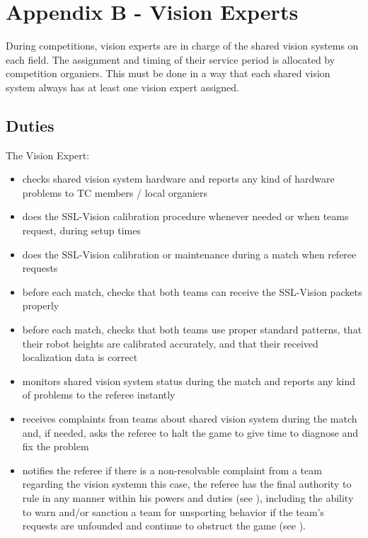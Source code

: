 \section{Appendix B - Vision Experts}\label{app:vision-experts}

During competitions, vision experts are in charge of the shared vision systems on each field.
The assignment and timing of their service period is allocated by competition organiers.
This must be done in a way that each shared vision system always has at least one vision expert assigned.

\subsection{Duties}
The Vision Expert:
\begin{itemize}
\item checks shared vision system hardware and reports any kind of hardware problems to TC members / local organiers
\item does the SSL-Vision calibration procedure whenever needed or when teams request, during setup times
\item does the SSL-Vision calibration or maintenance during a match when referee requests
\item before each match, checks that both teams can receive the SSL-Vision packets properly
\item before each match, checks that both teams use proper standard patterns, that their robot heights are calibrated accurately, and that their received localization data is correct
\item monitors shared vision system status during the match and reports any kind of problems to the referee instantly
\item receives complaints from teams about shared vision system during the match and, if needed, asks the referee to halt the game to give time to diagnose and fix the problem
\item notifies the referee if there is a non-resolvable complaint from a team regarding the vision systemn this case, the referee has the final authority to rule in any manner within his powers and duties (see ), including the ability to warn and/or sanction a team for unsporting behavior if the team's requests are unfounded and continue to obstruct the game (see ).
\end{itemize}
